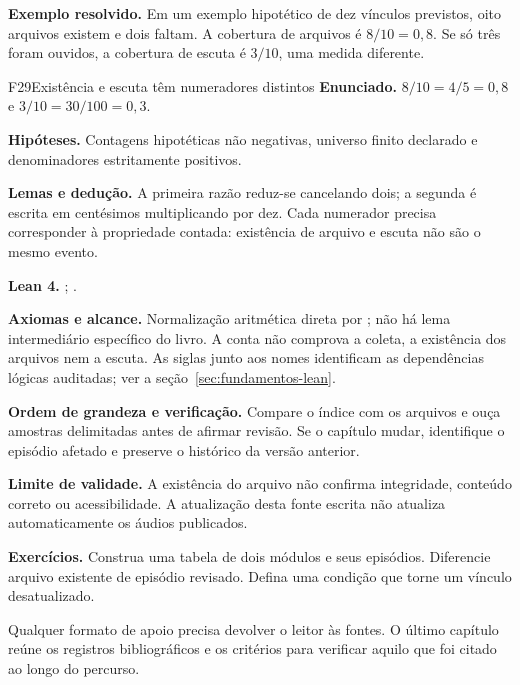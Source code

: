 \begin{resultado}
\textbf{Exemplo resolvido.} Em um exemplo hipotético de dez vínculos previstos, oito arquivos existem e dois faltam. A cobertura de arquivos é $8/10=0{,}8$. Se só três foram ouvidos, a cobertura de escuta é $3/10$, uma medida diferente.
\end{resultado}
\begin{formalizacao}{F29}{Existência e escuta têm numeradores distintos}
\textbf{Enunciado.} $8/10=4/5=0{,}8$ e $3/10=30/100=0{,}3$.

\textbf{Hipóteses.} Contagens hipotéticas não negativas, universo finito declarado e denominadores estritamente positivos.

\textbf{Lemas e dedução.} A primeira razão reduz-se cancelando dois; a segunda é escrita em centésimos multiplicando por dez. Cada numerador precisa corresponder à propriedade contada: existência de arquivo e escuta não são o mesmo evento.

\textbf{Lean 4.} ; .

\textbf{Axiomas e alcance.} Normalização aritmética direta por ; não há lema intermediário específico do livro. A conta não comprova a coleta, a existência dos arquivos nem a escuta. As siglas junto aos nomes identificam as dependências lógicas auditadas; ver a seção~\ref{sec:fundamentos-lean}.
\end{formalizacao}


\begin{resultado}
\textbf{Ordem de grandeza e verificação.} Compare o índice com os arquivos e ouça amostras delimitadas antes de afirmar revisão. Se o capítulo mudar, identifique o episódio afetado e preserve o histórico da versão anterior.
\end{resultado}

\begin{aviso}
\textbf{Limite de validade.} A existência do arquivo não confirma integridade, conteúdo correto ou acessibilidade. A atualização desta fonte escrita não atualiza automaticamente os áudios publicados.
\end{aviso}

\begin{resultado}
\textbf{Exercícios.} Construa uma tabela de dois módulos e seus episódios. Diferencie arquivo existente de episódio revisado. Defina uma condição que torne um vínculo desatualizado.
\end{resultado}

Qualquer formato de apoio precisa devolver o leitor às fontes. O último capítulo reúne os registros bibliográficos e os critérios para verificar aquilo que foi citado ao longo do percurso.
